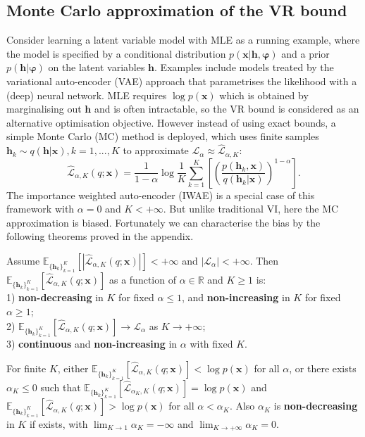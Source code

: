 \subsection{Monte Carlo approximation of the VR bound}
\label{sec:sampling}
Consider learning a latent variable model with MLE as a running example, where the model is specified by a conditional distribution $p(\bm{x}|\bm{h}, \bm{\varphi})$ and a prior $p(\bm{h}| \bm{\varphi})$ on the latent variables $\bm{h}$. Examples include models treated by the variational auto-encoder (VAE) approach \cite{kingma:vae, rezende:vae} that parametrises the likelihood with a (deep) neural network. MLE requires $\log p(\bm{x})$ which is obtained by marginalising out $\bm{h}$ and is often intractable, so the VR bound is considered as an alternative optimisation objective. However instead of using exact bounds, a simple Monte Carlo (MC) method is deployed, which uses finite samples $\bm{h}_k \sim q(\bm{h}|\bm{x}), k = 1, ..., K$ to approximate $\mathcal{L}_{\alpha} \approx \hat{\mathcal{L}}_{\alpha, K}$:
\begin{equation}
\label{eq:sampling_estimate}
\hat{\mathcal{L}}_{\alpha, K}(q; \bm{x}) = \frac{1}{1 - \alpha} \log \frac{1}{K} \sum_{k=1}^K \left[\left( \frac{p(\bm{h}_k, \bm{x})}{q(\bm{h}_k|\bm{x})} \right)^{1 - \alpha} \right].
\end{equation}
The importance weighted auto-encoder (IWAE) \cite{burda:iwae} is a special case of this framework with $\alpha = 0$ and $K < +\infty$. But unlike traditional VI, here the MC approximation is biased. Fortunately we can characterise the bias by the following theorems proved in the appendix.
%
\begin{theorem}
\label{thm:sampling_bound}
Assume $\mathbb{E}_{\{\bm{h}_k\}_{k=1}^K} [ |\hat{\mathcal{L}}_{\alpha, K}(q; \bm{x})| ] < + \infty$ and $|\mathcal{L}_{\alpha}| < +\infty$. Then $\mathbb{E}_{\{\bm{h}_k\}_{k=1}^K} [ \hat{\mathcal{L}}_{\alpha, K}(q; \bm{x}) ]$ as a function of $\alpha \in \mathbb{R}$ and $K \geq 1$ is: \\
1) \textbf{non-decreasing} in $K$ for fixed $\alpha \leq 1$, and \textbf{non-increasing} in $K$ for fixed $\alpha \geq 1$; \\
2) $\mathbb{E}_{\{\bm{h}_k\}_{k=1}^K} [ \hat{\mathcal{L}}_{\alpha, K}(q; \bm{x}) ] \rightarrow \mathcal{L}_{\alpha}$ as $K \rightarrow +\infty$; \\
3) \textbf{continuous} and \textbf{non-increasing} in $\alpha$ with fixed $K$.
\end{theorem}
%
\begin{corollary}
\label{thm:alpha_k_existence}
For finite $K$, either $\mathbb{E}_{\{\bm{h}_k\}_{k=1}^K} [ \hat{\mathcal{L}}_{\alpha, K}(q; \bm{x}) ] < \log p(\bm{x})$ for all $\alpha$, or there exists $\alpha_K \leq 0$ such that $\mathbb{E}_{\{\bm{h}_k\}_{k=1}^K} [ \hat{\mathcal{L}}_{\alpha_K, K}(q; \bm{x}) ] = \log p(\bm{x})$ and $\mathbb{E}_{\{\bm{h}_k\}_{k=1}^K} [ \hat{\mathcal{L}}_{\alpha, K}(q; \bm{x}) ] > \log p(\bm{x})$ for all $\alpha < \alpha_K$. Also $\alpha_K$ is \textbf{non-decreasing} in $K$ if exists, with $\lim_{K \rightarrow 1} \alpha_K = -\infty$ and $\lim_{K \rightarrow +\infty} \alpha_K = 0$.
\end{corollary}

